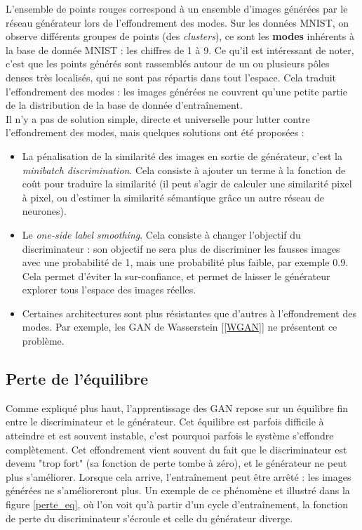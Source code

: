 L'ensemble de points rouges correspond à un ensemble d'images générées par le réseau générateur lors de l'effondrement des modes. Sur les données MNIST, on observe différents groupes de points (des \textit{clusters}), ce sont les \textbf{modes} inhérents à la base de donnée MNIST : les chiffres de 1 à 9. Ce qu'il est intéressant de noter, c'est que les points générés sont rassemblés autour de un ou plusieurs pôles denses très localisés, qui ne sont pas répartis dans tout l'espace. Cela traduit l'effondrement des modes : les images générées ne couvrent qu'une petite partie de la distribution de la base de donnée d’entraînement.\\

Il n'y a pas de solution simple, directe et universelle pour lutter contre l'effondrement des modes, mais quelques solutions ont été proposées :
\begin{itemize}
  \item La pénalisation de la similarité des images en sortie de générateur, c'est la \textit{minibatch discrimination}. Cela consiste à ajouter un terme à la fonction de coût pour traduire la similarité (il peut s'agir de calculer une similarité pixel à pixel, ou d'estimer la similarité sémantique grâce un autre réseau de neurones).
  \item Le \textit{one-side label smoothing}. Cela consiste à changer l'objectif du discriminateur : son objectif ne sera plus de discriminer les fausses images avec une probabilité de 1, mais une probabilité plus faible, par exemple 0.9. Cela permet d'éviter la sur-confiance, et permet de laisser le générateur explorer tous l'espace des images réelles.
  \item Certaines architectures sont plus résistantes que d'autres à l'effondrement des modes. Par exemple, les GAN de Wasserstein [\ref{WGAN}] ne présentent ce problème. 
\end{itemize}


\subsection{Perte de l'équilibre}

Comme expliqué plus haut, l'apprentissage des GAN repose sur un équilibre fin entre le discriminateur et le générateur. Cet équilibre est parfois difficile à atteindre et est souvent instable, c'est pourquoi parfois le système s'effondre complètement. Cet effondrement vient souvent du fait que le discriminateur est devenu "trop fort" (sa fonction de perte tombe à zéro), et le générateur ne peut plus s'améliorer. Lorsque cela arrive, l’entraînement peut être arrêté : les images générées ne s'amélioreront plus. Un exemple de ce phénomène et illustré dans la figure \ref{perte_eq}, où l'on voit qu'à partir d'un cycle d’entraînement, la fonction de perte du discriminateur s'écroule et celle du générateur diverge.

